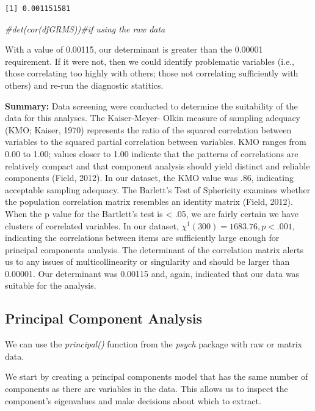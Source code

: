 \documentclass[
  english,
]{book}
\newenvironment{Shaded}{\begin{snugshade}}{\end{snugshade}}
\newcommand{\CommentTok}[1]{\textcolor[rgb]{0.56,0.35,0.01}{\textit{#1}}}
\begin{document}
\begin{verbatim}
[1] 0.001151581
\end{verbatim}

\begin{Shaded}
\begin{Highlighting}[]
\CommentTok{#det(cor(dfGRMS))#if using the raw data}
\end{Highlighting}
\end{Shaded}

With a value of 0.00115, our determinant is greater than the 0.00001 requirement. If it were not, then we could identify problematic variables (i.e., those correlating too highly with others; those not correlating sufficiently with others) and re-run the diagnostic statitics.

\textbf{Summary:} Data screening were conducted to determine the suitability of the data for this analyses. The Kaiser-Meyer- Olkin measure of sampling adequacy (KMO; Kaiser, 1970) represents the ratio of the squared correlation between variables to the squared partial correlation between variables. KMO ranges from 0.00 to 1.00; values closer to 1.00 indicate that the patterns of correlations are relatively compact and that component analysis should yield distinct and reliable components (Field, 2012). In our dataset, the KMO value was .86, indicating acceptable sampling adequacy. The Barlett's Test of Sphericity examines whether the population correlation matrix resembles an identity matrix (Field, 2012). When the p value for the Bartlett's test is \textless{} .05, we are fairly certain we have clusters of correlated variables. In our dataset, \(\chi ^{1}(300)=1683.76, p < .001\), indicating the correlations between items are sufficiently large enough for principal components analysis. The determinant of the correlation matrix alerts us to any issues of multicollinearity or singularity and should be larger than 0.00001. Our determinant was 0.00115 and, again, indicated that our data was suitable for the analysis.

\hypertarget{principal-component-analysis}{%
\subsection{Principal Component Analysis}\label{principal-component-analysis}}

We can use the \emph{principal()} function from the \emph{psych} package with raw or matrix data.

We start by creating a principal components model that has the same number of components as there are variables in the data. This allows us to inspect the component's eigenvalues and make decisions about which to extract.
\end{document}
